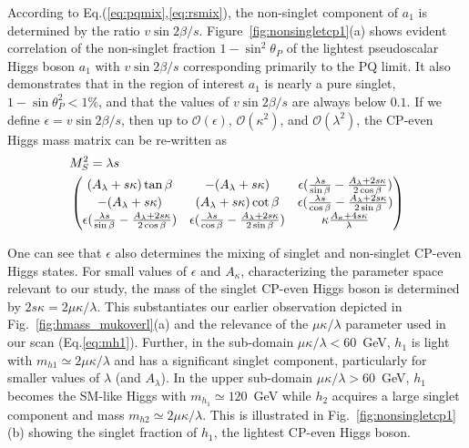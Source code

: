 \documentclass[aps,prl,twocolumn,nofootinbib,superscriptaddress]{revtex4}
\begin{document}
According to Eq.(\ref{eq:pqmix},\ref{eq:rsmix}), the non-singlet
component of $a_1$ is determined by the ratio $v \sin 2\beta / s$.
Figure~\ref{fig:nonsingletcp1}(a) shows evident correlation of the
non-singlet fraction $1 - \sin^2\theta_P$ of the lightest pseudoscalar
Higgs boson $a_1$ with $v \sin 2\beta / s$ corresponding primarily to
the PQ limit.  It also demonstrates that in the region of interest
$a_1$ is nearly a pure singlet, $1 - \sin\theta_P^2 < 1\%$, and that
the values of $v \sin 2\beta / s$ are always below $0.1$.  If we
define $\epsilon = {v \sin 2\beta / s}$, then up to
$\mathcal{O}(\epsilon)$, $\mathcal{O}(\kappa^2)$, and
$\mathcal{O}(\lambda^2)$, the CP-even Higgs mass matrix can be
re-written as
\begin{alignat}{2}
&M_S^2= \lambda s \\
\nonumber & \begin{pmatrix}
  (A_\lambda + s \kappa)\tan\beta  & - (A_\lambda + s \kappa)      & \epsilon ({\lambda s \over \sin\beta} -{A_\lambda + 2 s \kappa\over 2\cos\beta}) \\
       - (A_\lambda + s \kappa)  & (A_\lambda + s \kappa)\cot\beta  & \epsilon  ({\lambda s \over \cos\beta} -{A_\lambda + 2 s \kappa\over 2\sin\beta}) \\
\epsilon ({\lambda s \over \sin\beta} -{A_\lambda + 2 s \kappa\over 2\cos\beta}     )&   \epsilon ({\lambda s \over \cos\beta} -{A_\lambda + 2 s \kappa\over 2\sin\beta}) &
\kappa {A_\kappa+ 4 s \kappa \over \lambda}
\end{pmatrix}
\end{alignat}

One can see that $\epsilon$ also determines the mixing of singlet and
non-singlet CP-even Higgs states.  For small values of $\epsilon$ and
$A_\kappa$, characterizing the parameter space relevant to our study,
the mass of the singlet CP-even Higgs boson is determined by $2 s
\kappa = 2\mu\kappa/\lambda$.  This substantiates our earlier
observation depicted in Fig.~\ref{fig:hmass_mukoverl}(a) and the
relevance of the $\mu\kappa/\lambda$ parameter used in our scan
(Eq.\ref{eq:mh1}).  Further, in the sub-domain $\mu\kappa/\lambda <
60$~GeV, $h_1$ is light with $m_{h1} \simeq 2\mu\kappa/\lambda$ and has
a significant singlet component, particularly for smaller values of
$\lambda$ (and $A_\lambda$).  In the upper sub-domain $\mu
\kappa/\lambda > 60$~GeV, $h_1$ becomes the SM-like Higgs with
$m_{h_1} \simeq 120$~GeV while $h_2$ acquires a large singlet component
and mass $m_{h2} \simeq 2\mu\kappa/\lambda$.  This is illustrated in
Fig.~\ref{fig:nonsingletcp1}(b) showing the singlet fraction of $h_1$,
the lightest CP-even Higgs boson.
\end{document}
